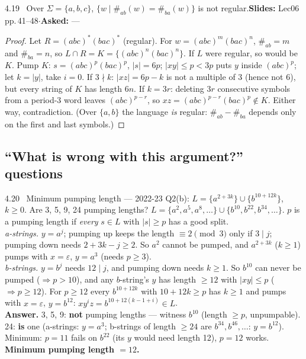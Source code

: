 \documentclass[10.5pt,a4paper]{article}
\newcommand{\src}[2]{{\footnotesize\color{gray!70!black}\textbf{Slides:} #1\enspace$\cdot$\enspace\textbf{Asked:} #2}\par}
\newcommand{\eps}{\varepsilon}
\begin{document}
\begin{thm}{4.19 \ Over $\Sigma=\{a,b,c\}$, $\{w\mid\#_{ab}(w)=\#_{ba}(w)\}$ is not regular.}\src{Lec06 pp.\,41--48}{---}\end{thm}
\begin{proof}
Let $R=(abc)^*(bac)^*$ (regular). For $w=(abc)^m(bac)^n$, $\#_{ab}=m$ and $\#_{ba}=n$, so $L\cap R=K=\{(abc)^n(bac)^n\}$. If $L$ were regular,
so would be $K$. Pump $K$: $s=(abc)^p(bac)^p$, $|s|=6p$; $|xy|\le p<3p$ puts $y$ inside $(abc)^p$; let $k=|y|$, take $i=0$. If $3\nmid k$:
$|xz|=6p-k$ is not a multiple of 3 (hence not 6), but every string of $K$ has length $6n$. If $k=3r$: deleting $3r$ consecutive symbols from
a period-3 word leaves $(abc)^{p-r}$, so $xz=(abc)^{p-r}(bac)^p\notin K$. Either way, contradiction. (Over $\{a,b\}$ the language
\emph{is} regular: $\#_{ab}-\#_{ba}$ depends only on the first and last symbols.)
\end{proof}

\subsection{``What is wrong with this argument?'' questions}

\begin{ans}{4.20 \ Minimum pumping length --- 2022-23 Q2(b): $L=\{a^{2+3k}\}\cup\{b^{10+12k}\}$, $k\ge0$. Are 3, 5, 9, 24 pumping lengths?}
$L=\{a^2,a^5,a^8,\dots\}\cup\{b^{10},b^{22},b^{34},\dots\}$. $p$ is a pumping length if \emph{every} $s\in L$ with $|s|\ge p$ has a good split.\\
\emph{a-strings.} $y=a^j$; pumping up keeps the length $\equiv2\pmod3$ only if $3\mid j$; pumping down needs $2+3k-j\ge2$. So $a^2$ cannot be
pumped, and $a^{2+3k}$ ($k\ge1$) pumps with $x=\eps$, $y=a^3$ (needs $p\ge3$).\\
\emph{b-strings.} $y=b^j$ needs $12\mid j$, and pumping down needs $k\ge1$. So $b^{10}$ can never be pumped ($\Rightarrow p>10$), and any
$b$-string's $y$ has length $\ge12$ with $|xy|\le p$ ($\Rightarrow p\ge12$). For $p\ge12$ every $b^{10+12k}$ with $10+12k\ge p$ has $k\ge1$ and
pumps with $x=\eps$, $y=b^{12}$: $xy^iz=b^{10+12(k-1+i)}\in L$.\\
\textbf{Answer.} 3, 5, 9: \textbf{not} pumping lengths --- witness $b^{10}$ (length $\ge p$, unpumpable). 24: \textbf{is} one (a-strings: $y=a^3$;
b-strings of length $\ge24$ are $b^{34},b^{46},\dots$: $y=b^{12}$). Minimum: $p=11$ fails on $b^{22}$ (its $y$ would need length 12), $p=12$
works. \textbf{Minimum pumping length $=12$.}
\end{ans}
\end{document}
